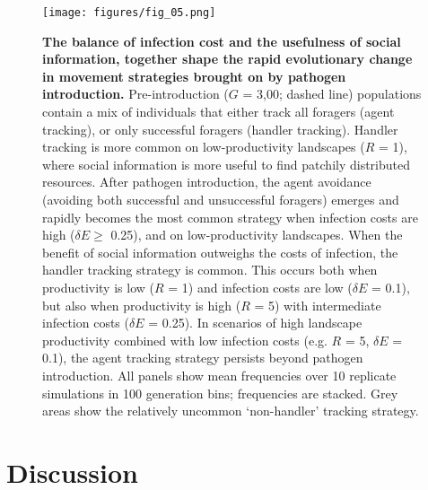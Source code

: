 \begin{figure}[!h]
    \centering
    \texttt{[image: figures/fig\_05.png]}
    \caption{
        \textbf{The balance of infection cost and the usefulness of social information, together shape the rapid evolutionary change in movement strategies brought on by pathogen introduction.}
        Pre-introduction ($G$ = 3,00; dashed line) populations contain a mix of individuals that either track all foragers (agent tracking), or only successful foragers (handler tracking).
        Handler tracking is more common on low-productivity landscapes ($R$ = 1), where social information is more useful to find patchily distributed resources.
        After pathogen introduction, the agent avoidance (avoiding both successful and unsuccessful foragers) emerges and rapidly becomes the most common strategy when infection costs are high ($\delta E \geq$ 0.25), and on low-productivity landscapes.
        When the benefit of social information outweighs the costs of infection, the handler tracking strategy is common.
        This occurs both when productivity is low ($R$ = 1) and infection costs are low ($\delta E$ = 0.1), but also when productivity is high ($R$ = 5) with intermediate infection costs ($\delta E$ = 0.25).
        In scenarios of high landscape productivity combined with low infection costs (e.g. $R$ = 5, $\delta E$ = 0.1), the agent tracking strategy persists beyond pathogen introduction.
        All panels show mean frequencies over 10 replicate simulations in 100 generation bins; frequencies are stacked.
        Grey areas show the relatively uncommon `non-handler' tracking strategy.
    }\label{patho_fig_05}
\end{figure}

\section*{Discussion}

